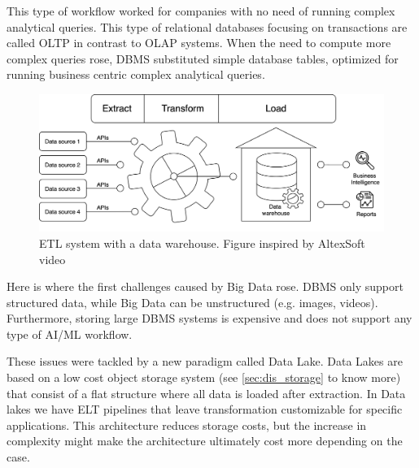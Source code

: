 This type of workflow worked for companies with no need of running complex analytical queries. This type of relational databases focusing on transactions are called \gls{OLTP} in contrast to \gls{OLAP} systems. When the need to compute more complex queries rose, \gls{DBMS} substituted simple database tables, optimized for running business centric complex analytical queries.

\begin{figure}[!ht]
    \begin{center}
      \includegraphics[width=\textwidth]{figures/2-background/DeltaLake_evolution-ETL+DW.png}
    \end{center}
    \caption{\gls{ETL} system with a data warehouse. Figure inspired by AltexSoft video \cite{altexsoftHowDataEngineering2021}}
    \label{fig:ETL+DW}
\end{figure}

Here is where the first challenges caused by Big Data rose. \gls{DBMS} only support structured data, while Big Data can be unstructured (e.g. images, videos). Furthermore, storing large \gls{DBMS} systems is expensive and does not support any type of \gls{AI}/\gls{ML} workflow.

These issues were tackled by a new paradigm called Data Lake. Data Lakes are based on a low cost object storage system (see \ref{sec:dis_storage} to know more) that consist of a flat structure where all data is loaded after extraction. In Data lakes we have \gls{ELT} pipelines that leave transformation customizable for specific applications. This architecture reduces storage costs, but the increase in complexity might make the architecture ultimately cost more depending on the case. 


